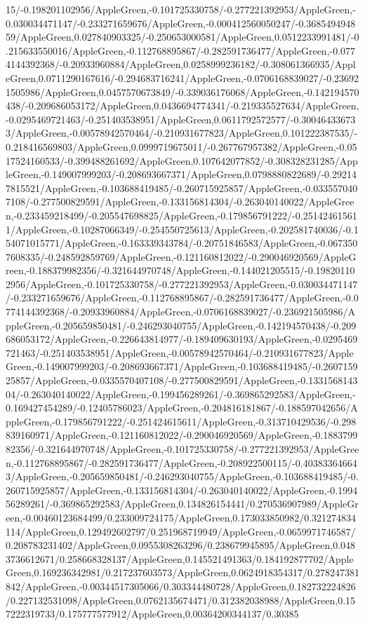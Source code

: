 {\begin{tikzternal}
{15/-0.198201102956/AppleGreen,-0.101725330758/-0.277221392953/AppleGreen,-0.030034471147/-0.233271659676/AppleGreen,-0.000412560050247/-0.368549494859/AppleGreen,0.027840903325/-0.250653000581/AppleGreen,0.0512233991481/-0.215633550016/AppleGreen,-0.112768895867/-0.282591736477/AppleGreen,-0.0774144392368/-0.20933960884/AppleGreen,0.0258999236182/-0.308061366935/AppleGreen,0.0711290167616/-0.294683716241/AppleGreen,-0.0706168839027/-0.236921505986/AppleGreen,0.0457570673849/-0.339036176068/AppleGreen,-0.142194570438/-0.209686053172/AppleGreen,0.0436694774341/-0.219335527634/AppleGreen,-0.0295469721463/-0.251403538951/AppleGreen,0.0611792572577/-0.300464336733/AppleGreen,-0.00578942570464/-0.210931677823/AppleGreen,0.101222387535/-0.218416569803/AppleGreen,0.0999719675011/-0.267767957382/AppleGreen,-0.0517524160533/-0.399488261692/AppleGreen,0.107642077852/-0.308328231285/AppleGreen,-0.149007999203/-0.208693667371/AppleGreen,0.0798880822689/-0.292147815521/AppleGreen,-0.103688419485/-0.260715925857/AppleGreen,-0.0335570407108/-0.277500829591/AppleGreen,-0.133156814304/-0.263040140022/AppleGreen,-0.233459218499/-0.205547698825/AppleGreen,-0.179856791222/-0.251424615611/AppleGreen,-0.10287066349/-0.254550725613/AppleGreen,-0.202581740036/-0.154071015771/AppleGreen,-0.163339343784/-0.20751846583/AppleGreen,-0.0673507608335/-0.248592859769/AppleGreen,-0.121160812022/-0.290046920569/AppleGreen,-0.188379982356/-0.321644970748/AppleGreen,-0.144021205515/-0.198201102956/AppleGreen,-0.101725330758/-0.277221392953/AppleGreen,-0.030034471147/-0.233271659676/AppleGreen,-0.112768895867/-0.282591736477/AppleGreen,-0.0774144392368/-0.20933960884/AppleGreen,-0.0706168839027/-0.236921505986/AppleGreen,-0.205659850481/-0.246293040755/AppleGreen,-0.142194570438/-0.209686053172/AppleGreen,-0.226643814977/-0.189409630193/AppleGreen,-0.0295469721463/-0.251403538951/AppleGreen,-0.00578942570464/-0.210931677823/AppleGreen,-0.149007999203/-0.208693667371/AppleGreen,-0.103688419485/-0.260715925857/AppleGreen,-0.0335570407108/-0.277500829591/AppleGreen,-0.133156814304/-0.263040140022/AppleGreen,-0.199456289261/-0.369865292583/AppleGreen,-0.169427454289/-0.12405786023/AppleGreen,-0.204816181867/-0.188597042656/AppleGreen,-0.179856791222/-0.251424615611/AppleGreen,-0.313710429536/-0.298839160971/AppleGreen,-0.121160812022/-0.290046920569/AppleGreen,-0.188379982356/-0.321644970748/AppleGreen,-0.101725330758/-0.277221392953/AppleGreen,-0.112768895867/-0.282591736477/AppleGreen,-0.208922500115/-0.403833646643/AppleGreen,-0.205659850481/-0.246293040755/AppleGreen,-0.103688419485/-0.260715925857/AppleGreen,-0.133156814304/-0.263040140022/AppleGreen,-0.199456289261/-0.369865292583/AppleGreen,0.134826154441/0.270536907989/AppleGreen,-0.00460123684499/0.233009724175/AppleGreen,0.173033850982/0.321274834114/AppleGreen,0.129492602797/0.251968719949/AppleGreen,-0.0659971746587/0.208783231402/AppleGreen,0.0955308263296/0.238679945895/AppleGreen,0.0483736612671/0.258668328137/AppleGreen,0.145521491363/0.184192877702/AppleGreen,0.169236342981/0.217237603573/AppleGreen,0.0624918354317/0.278247381842/AppleGreen,-0.00344517305066/0.303344480728/AppleGreen,0.182732224826/0.227132531098/AppleGreen,0.0762135674471/0.312382038988/AppleGreen,0.157222319733/0.175777577912/AppleGreen,0.00364200344137/0.30385}
\end{tikzternal}}
